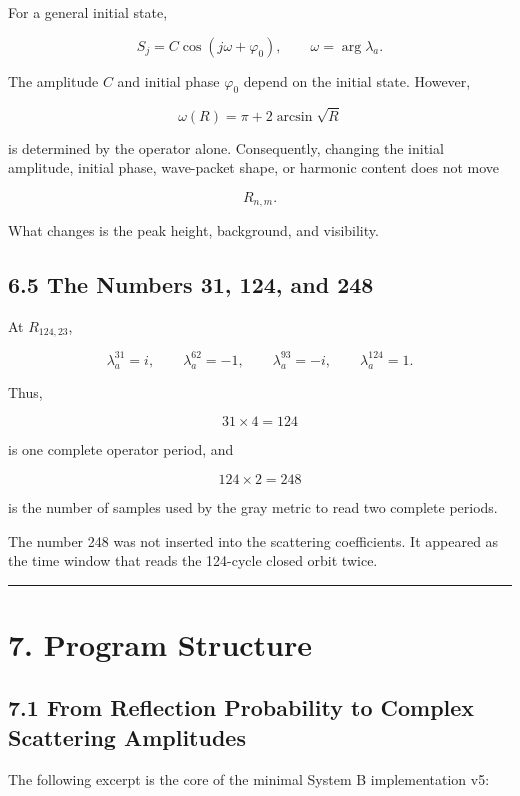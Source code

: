 \documentclass[
  10pt,
  a4paper,
]{article}
\begin{document}
For a general initial state,

\[
S_j=C\cos(j\omega+\varphi_0),
\qquad
\omega=\arg\lambda_a.
\]

The amplitude \(C\) and initial phase \(\varphi_0\) depend on the
initial state. However,

\[
\omega(R)=\pi+2\arcsin\sqrt R
\]

is determined by the operator alone. Consequently, changing the initial
amplitude, initial phase, wave-packet shape, or harmonic content does
not move

\[
R_{n,m}.
\]

What changes is the peak height, background, and visibility.

\subsection{6.5 The Numbers 31, 124, and
248}\label{the-numbers-31-124-and-248}

At \(R_{124,23}\),

\[
\lambda_a^{31}=i,
\qquad
\lambda_a^{62}=-1,
\qquad
\lambda_a^{93}=-i,
\qquad
\lambda_a^{124}=1.
\]

Thus,

\[
31\times4=124
\]

is one complete operator period, and

\[
124\times2=248
\]

is the number of samples used by the gray metric to read two complete
periods.

The number 248 was not inserted into the scattering coefficients. It
appeared as the time window that reads the 124-cycle closed orbit twice.

\begin{center}\rule{0.5\linewidth}{0.5pt}\end{center}

\section{7. Program Structure}\label{program-structure}

\subsection{7.1 From Reflection Probability to Complex Scattering
Amplitudes}\label{from-reflection-probability-to-complex-scattering-amplitudes}

The following excerpt is the core of the minimal System B implementation
v5:
\end{document}
